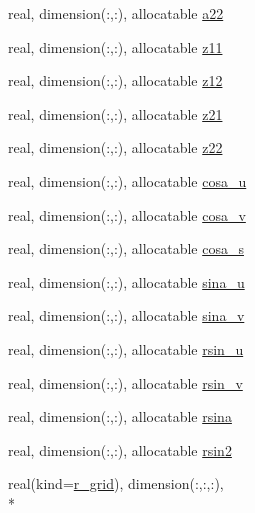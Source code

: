 \begin{DoxyCompactItemize}
\item 
real, dimension(\-:,\-:), allocatable \hyperlink{structfv__arrays__mod_1_1fv__grid__type_a71399bdc443a16413a309a4e50346579}{a22}
\item 
real, dimension(\-:,\-:), allocatable \hyperlink{structfv__arrays__mod_1_1fv__grid__type_a61173daebde1950c12444005f06a0c86}{z11}
\item 
real, dimension(\-:,\-:), allocatable \hyperlink{structfv__arrays__mod_1_1fv__grid__type_a424c7bea81647f4db6ed99e7aa356f25}{z12}
\item 
real, dimension(\-:,\-:), allocatable \hyperlink{structfv__arrays__mod_1_1fv__grid__type_ab93ef0fd752a80fee92d1678785883a1}{z21}
\item 
real, dimension(\-:,\-:), allocatable \hyperlink{structfv__arrays__mod_1_1fv__grid__type_a7b7f8aa4fc1c048e446478aea5e5d601}{z22}
\item 
real, dimension(\-:,\-:), allocatable \hyperlink{structfv__arrays__mod_1_1fv__grid__type_ae5c3bb087e289619efb5f97c042260c5}{cosa\-\_\-u}
\item 
real, dimension(\-:,\-:), allocatable \hyperlink{structfv__arrays__mod_1_1fv__grid__type_aea1d9e2e29779a878372fa6217b566ca}{cosa\-\_\-v}
\item 
real, dimension(\-:,\-:), allocatable \hyperlink{structfv__arrays__mod_1_1fv__grid__type_af10303762478f589c82cf17f634b26f8}{cosa\-\_\-s}
\item 
real, dimension(\-:,\-:), allocatable \hyperlink{structfv__arrays__mod_1_1fv__grid__type_a70d829477110ac82f38065460ef5b6b3}{sina\-\_\-u}
\item 
real, dimension(\-:,\-:), allocatable \hyperlink{structfv__arrays__mod_1_1fv__grid__type_aa999d53d66859c4c08851b7a74e7449e}{sina\-\_\-v}
\item 
real, dimension(\-:,\-:), allocatable \hyperlink{structfv__arrays__mod_1_1fv__grid__type_a28cfd8dc8c410d88a05c5c278643f76b}{rsin\-\_\-u}
\item 
real, dimension(\-:,\-:), allocatable \hyperlink{structfv__arrays__mod_1_1fv__grid__type_a97dd5675fd3857c4a44ea673984bb618}{rsin\-\_\-v}
\item 
real, dimension(\-:,\-:), allocatable \hyperlink{structfv__arrays__mod_1_1fv__grid__type_a97d2a9ff82ba04efc2bb3747b0889bc0}{rsina}
\item 
real, dimension(\-:,\-:), allocatable \hyperlink{structfv__arrays__mod_1_1fv__grid__type_a4301506b2d2eb21bb86eab20c47c988e}{rsin2}
\item 
real(kind=\hyperlink{classfv__arrays__mod_ab0ba8527d270f349a84fa0a330be1923}{r\-\_\-grid}), dimension(\-:,\-:,\-:), \\*

\end{DoxyCompactItemize}
